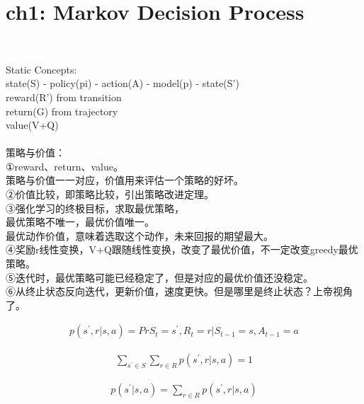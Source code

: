 \documentclass{article}
\begin{document}
\section*{ch1: Markov Decision Process}


~ \\[3pt]
\begin{CJK}{UTF8}{gbsn}
    Static Concepts: \\[3pt]
    state(S) - policy(pi) - action(A) - model(p) - state(S') \\[3pt]
    reward(R') from transition \\[3pt]
    return(G) from trajectory \\[3pt]
    value(V+Q) \\[3pt]

    ~ \\[3pt]
    策略与价值：\\[3pt]
    ①reward、return、value。 \\[3pt]
    策略与价值一一对应，价值用来评估一个策略的好坏。 \\[3pt]
    ②价值比较，即策略比较，引出策略改进定理。 \\[3pt]
    ③强化学习的终极目标，求取最优策略， \\[3pt]
    最优策略不唯一，最优价值唯一。 \\[3pt]
    最优动作价值，意味着选取这个动作，未来回报的期望最大。 \\[3pt]
    ④奖励r线性变换，V+Q跟随线性变换，改变了最优价值，不一定改变greedy最优策略。 \\[3pt]
    ⑤迭代时，最优策略可能已经稳定了，但是对应的最优价值还没稳定。 \\[3pt]
    ⑥从终止状态反向迭代，更新价值，速度更快。但是哪里是终止状态？上帝视角了。 \\[3pt]
\end{CJK}


\begin{align*}
    p ( s^{\prime}, r | s, a ) 
    = Pr { S_{t}=s^{\prime}, R_{t}=r | S_{t-1}=s, A_{t-1}=a } 
\end{align*}

\begin{align*}
    \sum_{s^{\prime} \in S} \sum_{r \in R} 
    p ( s^{\prime}, r | s, a ) = 1 
\end{align*}

\begin{align*}
    p ( s^{\prime} | s, a ) 
    = \sum_{r \in R} p ( s^{\prime}, r | s, a ) 
\end{align*}
\end{document}
